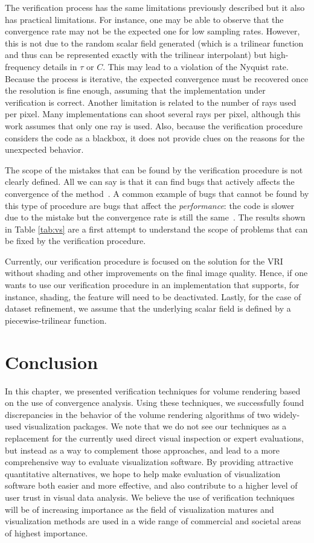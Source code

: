 The verification process has the same limitations previously described
but it also has practical limitations. For instance, one may be able
to observe that the convergence rate may not be the expected one for
low sampling rates. However, this is not due to the random scalar
field generated (which is a trilinear function and thus can be
represented exactly with the trilinear interpolant) but
high-frequency details in $\tau$ or $C$. This may lead to a violation
of the Nyquist rate. Because the process is iterative, 
the expected convergence must be recovered once the
resolution is fine enough, assuming that the implementation under
verification is correct.
Another limitation is related to the number of
rays used per pixel. Many implementations can shoot several rays per
pixel, although this work assumes that only one ray is used. Also,
because the verification procedure considers the code as a blackbox,
it does not provide clues on the reasons for the unexpected behavior.

The scope of the mistakes that can be found by the verification
procedure is not clearly defined. All we can say is that it can find
bugs that actively affects the convergence of the
method~\cite{KnuppSalari02}. A common example of bugs that cannot be
found by this type of procedure are bugs that affect the
\emph{performance}: the code is slower due to the mistake but the
convergence rate is still the same~\cite{roach98}. The results shown in
Table \ref{tab:vs} are a first attempt to understand the scope of problems
that can be fixed by the verification procedure.

Currently, our verification procedure is focused on the solution for
the VRI without shading and other improvements on the final image
quality. Hence, if one wants to use our verification procedure in an
implementation that supports, for instance, shading, the feature will
need to be deactivated. Lastly, for the case of dataset refinement, we
assume that the underlying scalar field is defined by a piecewise-trilinear
function.
\section{Conclusion}
\label{sec:conclusion}

In this chapter, we presented verification techniques for volume rendering
based on the use of convergence analysis. Using these techniques, we
successfully found discrepancies in the behavior of the volume
rendering algorithms of two widely-used visualization packages.  We
note that we do not see our techniques as a replacement for the
currently used direct visual inspection or expert evaluations, but
instead as a way to complement those approaches, and lead to a more
comprehensive way to evaluate visualization software.  By providing
attractive quantitative alternatives, we hope to help make evaluation
of visualization software both easier and more effective, and also
contribute to a higher level of user trust in visual data analysis. We
believe the use of verification techniques will be of increasing
importance as the field of visualization matures and visualization
methods are used in a wide range of commercial and societal areas of
highest importance.

